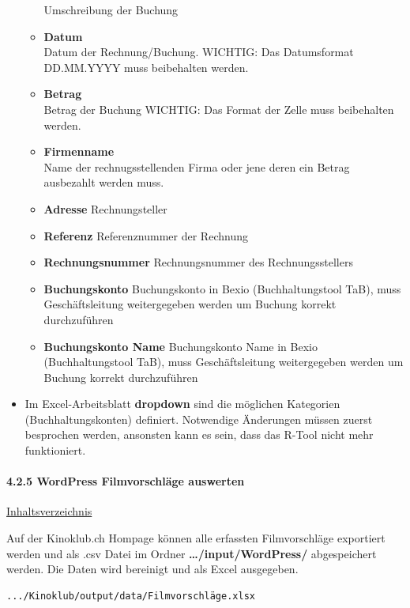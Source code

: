 \documentclass[
]{article}
\begin{document}
\begin{itemize}
\begin{itemize}
    Umschreibung der Buchung
  \item
    \textbf{Datum}\\
    Datum der Rechnung/Buchung. WICHTIG: Das Datumsformat DD.MM.YYYY
    muss beibehalten werden.
  \item
    \textbf{Betrag}\\
    Betrag der Buchung WICHTIG: Das Format der Zelle muss beibehalten
    werden.
  \item
    \textbf{Firmenname}\\
    Name der rechnugsstellenden Firma oder jene deren ein Betrag
    ausbezahlt werden muss.
  \item
    \textbf{Adresse} Rechnungsteller
  \item
    \textbf{Referenz} Referenznummer der Rechnung
  \item
    \textbf{Rechnungsnummer} Rechnungsnummer des Rechnungsstellers
  \item
    \textbf{Buchungskonto} Buchungskonto in Bexio (Buchhaltungstool
    TaB), muss Geschäftsleitung weitergegeben werden um Buchung korrekt
    durchzuführen
  \item
    \textbf{Buchungskonto Name} Buchungskonto Name in Bexio
    (Buchhaltungstool TaB), muss Geschäftsleitung weitergegeben werden
    um Buchung korrekt durchzuführen
  \end{itemize}
\item
  Im Excel-Arbeitsblatt \textbf{dropdown} sind die möglichen Kategorien
  (Buchhaltungskonten) definiert. Notwendige Änderungen müssen zuerst
  besprochen werden, ansonsten kann es sein, dass das R-Tool nicht mehr
  funktioniert.
\end{itemize}

\paragraph{4.2.5 WordPress Filmvorschläge
auswerten}\label{wordpress-filmvorschluxe4ge-auswerten}

\hyperref[Inhaltsverzeichnis]{Inhaltsverzeichnis}

Auf der Kinoklub.ch Hompage können alle erfassten Filmvorschläge
exportiert werden und als .csv Datei im Ordner
\textbf{\ldots/input/WordPress/} abgespeichert werden. Die Daten wird
bereinigt und als Excel ausgegeben.

\begin{verbatim}
.../Kinoklub/output/data/Filmvorschläge.xlsx
\end{verbatim}
\end{document}
